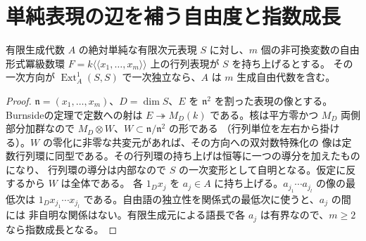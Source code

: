 \section{単純表現の辺を補う自由度と指数成長}
\label{sec:simple-linear-completion-growth}
\begin{lemma}\label{lem:free-tangent-directions}
有限生成代数 $A$ の絶対単純な有限次元表現 $S$ に対し、$m$ 個の非可換変数の自由形式冪級数環
$F=k\langle\!\langle x_1,\ldots,x_m\rangle\!\rangle$ 上の行列表現が $S$ を持ち上げるとする。
その一次方向が $\operatorname{Ext}^1_A(S,S)$ で一次独立なら、$A$ は $m$ 生成自由代数を含む。
\end{lemma}
\begin{proof}
$\mathfrak n=(x_1,\ldots,x_m)$、$D=\dim S$、$E$ を $\mathfrak n^2$ を割った表現の像とする。
Burnsideの定理で定数への射は $E\twoheadrightarrow M_D(k)$ である。核は平方零かつ
$M_D$ 両側部分加群なので $M_D\otimes W$、$W\subset\mathfrak n/\mathfrak n^2$ の形である
（行列単位を左右から掛ける）。$W$ の零化に非零な共変元があれば、その方向への双対数特殊化の
像は定数行列環に同型である。その行列環の持ち上げは恒等に一つの導分を加えたものになり、
行列環の導分は内部なので $S$ の一次変形として自明となる。仮定に反するから $W$ は全体である。
各 $1_D x_j$ を $a_j\in A$ に持ち上げる。$a_{j_1}\cdots a_{j_l}$ の像の最低次は
$1_D x_{j_1}\cdots x_{j_l}$ である。自由語の独立性を関係式の最低次に使うと、$a_j$ の間には
非自明な関係はない。有限生成元による語長で各 $a_j$ は有界なので、$m\ge2$ なら指数成長となる。
\end{proof}

